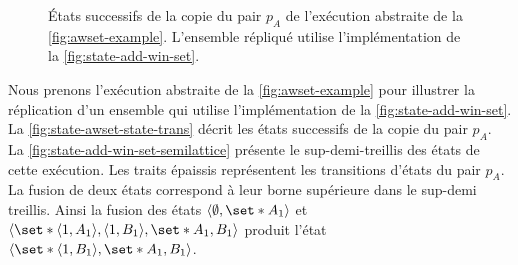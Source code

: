 \begin{figure}[tbh]
\centering
{}
\caption[États successifs de la copie du pair $p_A$ de l'exécution abstraite de la \autoref{fig:awset-example}]{États successifs de la copie du pair $p_A$ de l'exécution abstraite de la \autoref{fig:awset-example}.
L'ensemble répliqué utilise l'implémentation de la \autoref{fig:state-add-win-set}.}\label{fig:state-awset-state-trans}
\end{figure}

Nous prenons l'exécution abstraite de la \autoref{fig:awset-example} pour illustrer la réplication d'un ensemble qui utilise l'implémentation de la \autoref{fig:state-add-win-set}.
La \autoref{fig:state-awset-state-trans} décrit les états successifs de la copie du pair $p_A$.
La \autoref{fig:state-add-win-set-semilattice} présente le sup-demi-treillis des états de cette exécution.
Les traits épaissis représentent les transitions d'états du pair $p_A$.
La fusion de deux états correspond à leur borne supérieure dans le sup-demi treillis.
Ainsi la fusion des états $\tuple*{\emptyset,\set*{A_1}}$ et $\tuple*{\set*{\tuple*{1,A_1},\tuple*{1,B_1}},\set*{A_1,B_1}}$ produit l'état $\tuple*{\set*{\tuple*{1,B_1}},\set*{A_1,B_1}}$.

